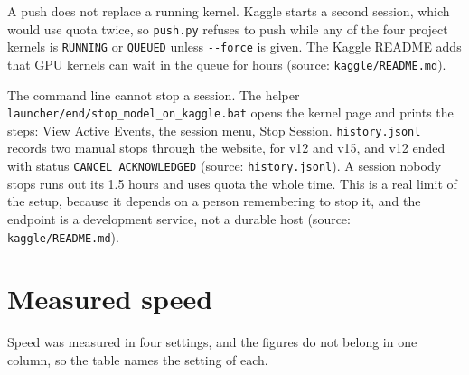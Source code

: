 \documentclass[11pt,a4paper]{report}
\begin{document}
A push does not replace a running kernel. Kaggle starts a second session, which would use quota twice, so \texttt{push.\allowbreak{}py} refuses to push while any of the four project kernels is \texttt{RUNNING} or \texttt{QUEUED} unless \texttt{-\allowbreak{}-\allowbreak{}force} is given. The Kaggle README adds that GPU kernels can wait in the queue for hours (source: \texttt{kaggle/\allowbreak{}README.\allowbreak{}md}).

The command line cannot stop a session. The helper \texttt{launcher/\allowbreak{}end/\allowbreak{}stop\_\allowbreak{}model\_\allowbreak{}on\_\allowbreak{}kaggle.\allowbreak{}bat} opens the kernel page and prints the steps: View Active Events, the session menu, Stop Session. \texttt{history.\allowbreak{}jsonl} records two manual stops through the website, for v12 and v15, and v12 ended with status \texttt{CANCEL\_\allowbreak{}ACKNOWLEDGED} (source: \texttt{history.\allowbreak{}jsonl}). A session nobody stops runs out its 1.5 hours and uses quota the whole time. This is a real limit of the setup, because it depends on a person remembering to stop it, and the endpoint is a development service, not a durable host (source: \texttt{kaggle/\allowbreak{}README.\allowbreak{}md}).

\section{Measured speed}

Speed was measured in four settings, and the figures do not belong in one column, so the table names the setting of each.
\end{document}
